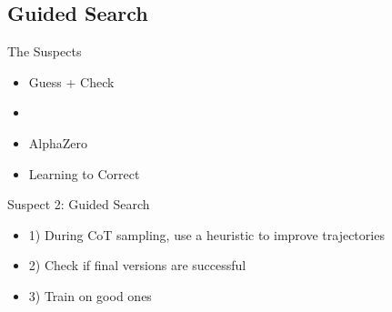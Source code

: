 \documentclass[14pt,aspectratio=169]{beamer}
\begin{document}
\subsection{Guided Search}

\begin{frame}{The Suspects}
	\begin{itemize}
		\item Guess + Check
		\item {}
		\item AlphaZero
		\item Learning to Correct
	\end{itemize}
\end{frame}


\begin{frame}{Suspect 2: Guided Search}
	\begin{itemize}
		\item 1) During CoT sampling, use a heuristic to
		      improve trajectories
		\item 2) Check if final versions are successful
		\item 3) Train on good ones
	\end{itemize}
\end{frame}
\end{document}
